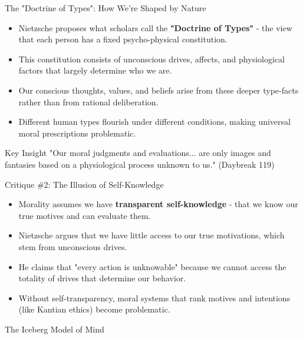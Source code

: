 \documentclass{beamer}
\begin{document}
\begin{frame}{The "Doctrine of Types": How We're Shaped by Nature}
\begin{itemize}
\item Nietzsche proposes what scholars call the \textbf{"Doctrine of Types"} - the view that each person has a fixed psycho-physical constitution.
\item This constitution consists of unconscious drives, affects, and physiological factors that largely determine who we are.
\item Our conscious thoughts, values, and beliefs arise from these deeper type-facts rather than from rational deliberation.
\item Different human types flourish under different conditions, making universal moral prescriptions problematic.
\end{itemize}

\begin{alertblock}{Key Insight}
"Our moral judgments and evaluations... are only images and fantasies based on a physiological process unknown to us." (Daybreak 119)
\end{alertblock}
\end{frame}


\begin{frame}{Critique \#2: The Illusion of Self-Knowledge}
\begin{itemize}
\item Morality assumes we have \textbf{transparent self-knowledge} - that we know our true motives and can evaluate them.
\item Nietzsche argues that we have little access to our true motivations, which stem from unconscious drives.
\item He claims that "every action is unknowable" because we cannot access the totality of drives that determine our behavior.
\item Without self-transparency, moral systems that rank motives and intentions (like Kantian ethics) become problematic.
\end{itemize}

\begin{block}{The Iceberg Model of Mind}
\begin{center}
\end{center}
\end{block}

\end{frame}
\end{document}
